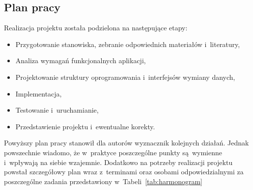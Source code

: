 \subsection{Plan pracy}
Realizacja projektu została podzielona na następujące etapy:
\begin{itemize}
\item Przygotowanie stanowiska, zebranie odpowiednich materiałów i~literatury,
\item Analiza wymagań funkcjonalnych aplikacji,
\item Projektowanie struktury oprogramowania i~interfejsów wymiany danych,
\item Implementacja,
\item Testowanie i~uruchamianie,
\item Przedstawienie projektu i~ewentualne korekty.
\end{itemize}
\indent
\indent Powyższy plan pracy stanowił dla autorów wyznacznik kolejnych działań. Jednak powszechnie wiadomo, że w~praktyce poszczególne punkty są~wymienne i~wpływają na siebie wzajemnie. Dodatkowo na potrzeby realizacji projektu powstał szczegółowy plan wraz z~terminami oraz osobami odpowiedzialnymi za poszczególne zadania przedstawiony w~Tabeli~\ref{tab:harmonogram}

